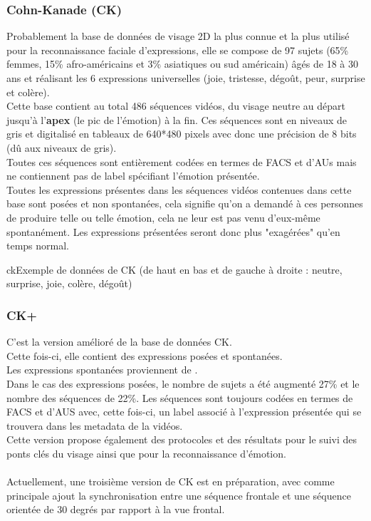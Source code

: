 \documentclass[overfullbox, poster]{polytech/polytech}
\begin{document}
\subsubsection{Cohn-Kanade (CK) \cite{ck}}
Probablement la base de données de visage 2D la plus connue et la plus utilisé pour la reconnaissance faciale d'expressions, elle se compose de 97 sujets (65\% femmes, 15\% afro-américains et 3\% asiatiques ou sud américain) âgés de 18 à 30 ans et réalisant les 6 expressions universelles (joie, tristesse, dégoût, peur, surprise et colère).\\
Cette base contient au total 486 séquences vidéos, du visage neutre au départ jusqu'à l'\textbf{apex} (le pic de l'émotion) à la fin. Ces séquences sont en niveaux de gris et digitalisé en tableaux de 640*480 pixels avec donc une précision de 8 bits (dû aux niveaux de gris).\\
Toutes ces séquences sont entièrement codées en termes de FACS et d'AUs mais ne contiennent pas de label spécifiant l'émotion présentée.\\
Toutes les expressions présentes dans les séquences vidéos contenues dans cette base sont posées et non spontanées, cela signifie qu'on a demandé à ces personnes de produire telle ou telle émotion, cela ne leur est pas venu d'eux-même spontanément. Les expressions présentées seront donc plus "exagérées" qu'en temps normal.

\begin{Figure}{ck}{Exemple de données de CK (de haut en bas et de gauche à droite : neutre, surprise, joie, colère, dégoût)}
\end{Figure}

\subsubsection{CK+ \cite{ckplus}}
C'est la version amélioré de la base de données CK.\\
Cette fois-ci, elle contient des expressions posées et spontanées.\\
Les expressions spontanées proviennent de \cite{ambadar}. \\
Dans le cas des expressions posées, le nombre de sujets a été augmenté 27\% et le nombre des séquences de 22\%.
Les séquences sont toujours codées en termes de FACS et d'AUS avec, cette fois-ci, un label associé à l'expression présentée qui se trouvera dans les metadata de la vidéos.\\
Cette version propose également des protocoles et des résultats pour le suivi des ponts clés du visage ainsi que pour la reconnaissance d'émotion.\\
\\
Actuellement, une troisième version de CK est en préparation, avec comme principale ajout la synchronisation entre une séquence frontale et une séquence orientée de 30 degrés par rapport à la vue frontal.
\end{document}
